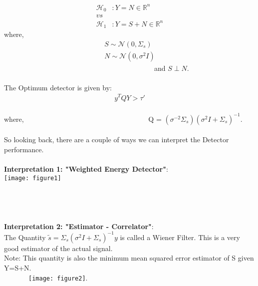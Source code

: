 \documentclass[a4paper,english,12pt]{article}
\begin{document}
 \begin{align*}
 \mathcal{H}_0 &: Y = N \in \mathbb{R}^n\\
 vs\\
 \mathcal{H}_1 &: Y = S+N \in \mathbb{R}^n 
 \end{align*}
 where,  
 \begin{align*}  
 S\sim \mathcal{N}(0,\Sigma_s)\\
 N\sim \mathcal{N}(0,\sigma^2I)
 \end{align*} \ \ \ \ \ \ \ \ \ \ \ \ \ \ \ \ \ \ \ \ \ \ \ \ \ \ \ \ \ \ \ \ \ \ \ \ \ \ \ \ \ \ \ and $S\perp N$.\\
\\ The Optimum detector is given by:\\
     \begin{align*}
       y^TQY>\tau'
       \end{align*}\\
   where,
 \ \ \ \ \ \ \ \ \ \ \ \ \ \ \ \ \ \ \ \ \ \ \ \ \ \ \ \ \ \ \ \ \ \ \ Q = $(\sigma^{-2}\Sigma_s)(\sigma^{2}I+\Sigma_s)^{-1}$.\\
 \\So looking back, there are a couple of ways we can interpret the Detector performance.\\
 \\\textbf{Interpretation 1: "Weighted Energy Detector"}:\\
 \texttt{[image: figure1]}\\
 \\
 \\
 \\
 \\\textbf{Interpretation 2: "Estimator - Correlator"}:\\
 The Quantity $\tilde{s}=\Sigma_s(\sigma^2I + \Sigma_s)^{-1}y$ is called a Wiener Filter. This is a very good estimator of the actual signal.\\
 Note: This quantity is also the minimum mean squared error estimator of S given Y=S+N.\\
 
 \ \ \ \ \ \ \ \texttt{[image: figure2]}.
\end{document}

